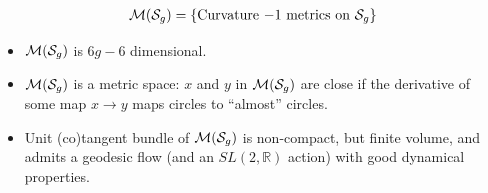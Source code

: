 \begin{frame}
  \begin{align*}
    \mathcal{M}(\mathcal{S}_g) = \left\{ \text{Curvature $-1$ metrics on $\mathcal{S}_g$} \right\}
  \end{align*}
  \begin{itemize}
  \item<2-> $\mathcal{M}(\mathcal{S}_g)$ is $6g-6$ dimensional.
  \item<3-> $\mathcal{M}(\mathcal{S}_g)$ is a metric space: $x$ and $y$ in $\mathcal{M}(\mathcal{S}_g)$ are close if the derivative of some map $x \to y$ maps circles to ``almost'' circles.
  \item<4-> Unit (co)tangent bundle of $\mathcal{M}(\mathcal{S}_g)$ is non-compact, but finite volume, and admits a geodesic flow (and an $SL(2, \mathbb{R})$ action) with good dynamical properties.
  \end{itemize}
\end{frame}

